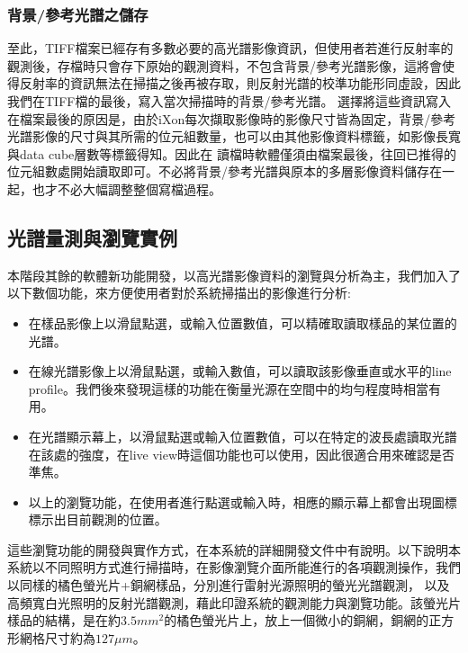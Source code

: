 \documentclass[12pt]{article}
\begin{document}
\subsubsection{背景/參考光譜之儲存}
至此，TIFF檔案已經存有多數必要的高光譜影像資訊，但使用者若進行反射率的觀測後，存檔時只會存下原始的觀測資料，不包含背景/參考光譜影像，這將會使得反射率的資訊無法在掃描之後再被存取，則反射光譜的校準功能形同虛設，因此我們在TIFF檔的最後，寫入當次掃描時的背景/參考光譜。
選擇將這些資訊寫入在檔案最後的原因是，由於iXon每次擷取影像時的影像尺寸皆為固定，背景/參考光譜影像的尺寸與其所需的位元組數量，也可以由其他影像資料標籤，如影像長寬與data cube層數等標籤得知。因此在
讀檔時軟體僅須由檔案最後，往回已推得的位元組數處開始讀取即可。不必將背景/參考光譜與原本的多層影像資料儲存在一起，也才不必大幅調整整個寫檔過程。

\subsection{光譜量測與瀏覽實例}
本階段其餘的軟體新功能開發，以高光譜影像資料的瀏覽與分析為主，我們加入了以下數個功能，來方便使用者對於系統掃描出的影像進行分析:
\begin{itemize}
    \item 在樣品影像上以滑鼠點選，或輸入位置數值，可以精確取讀取樣品的某位置的光譜。
    \item 在線光譜影像上以滑鼠點選，或輸入數值，可以讀取該影像垂直或水平的line profile。我們後來發現這樣的功能在衡量光源在空間中的均勻程度時相當有用。
    \item 在光譜顯示幕上，以滑鼠點選或輸入位置數值，可以在特定的波長處讀取光譜在該處的強度，在live view時這個功能也可以使用，因此很適合用來確認是否準焦。
    \item 以上的瀏覽功能，在使用者進行點選或輸入時，相應的顯示幕上都會出現圖標標示出目前觀測的位置。
\end{itemize}
這些瀏覽功能的開發與實作方式，在本系統的詳細開發文件中有說明。\cite{sysDoc}以下說明本系統以不同照明方式進行掃描時，在影像瀏覽介面所能進行的各項觀測操作，我們以同樣的橘色螢光片+銅網樣品，分別進行雷射光源照明的螢光光譜觀測，
以及高頻寬白光照明的反射光譜觀測，藉此印證系統的觀測能力與瀏覽功能。該螢光片樣品的結構，是在約$3.5mm^2$的橘色螢光片上，放上一個微小的銅網，銅網的正方形網格尺寸約為$127\mu m$。
\end{document}
